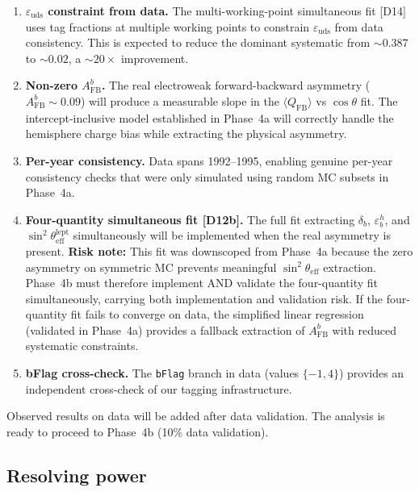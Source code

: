 \documentclass[11pt,a4paper]{article}
\begin{document}
\begin{enumerate}
\item \textbf{$\varepsilon_\mathrm{uds}$ constraint from data.} The multi-working-point
simultaneous fit [D14] uses tag fractions at multiple working points to constrain
$\varepsilon_\mathrm{uds}$ from data consistency. This is expected to reduce the
dominant systematic from $\sim 0.387$ to $\sim 0.02$, a $\sim 20\times$ improvement.

\item \textbf{Non-zero $A_\mathrm{FB}^b$.} The real electroweak forward-backward
asymmetry ($A_\mathrm{FB}^b \sim 0.09$) will produce a measurable slope in the
$\langle Q_\mathrm{FB} \rangle$ vs $\cos\theta$ fit. The intercept-inclusive model
established in Phase~4a will correctly handle the hemisphere charge bias while
extracting the physical asymmetry.

\item \textbf{Per-year consistency.} Data spans 1992--1995, enabling genuine per-year
consistency checks that were only simulated using random MC subsets in Phase~4a.

\item \textbf{Four-quantity simultaneous fit [D12b].} The full fit extracting
$\delta_b$, $\varepsilon_b^h$, and $\sin^2\theta_\mathrm{eff}^\mathrm{lept}$
simultaneously will be implemented when the real asymmetry is present.
\textbf{Risk note:} This fit was downscoped from Phase~4a because the
zero asymmetry on symmetric MC prevents meaningful $\sin^2\theta_\mathrm{eff}$
extraction. Phase~4b must therefore implement AND validate the four-quantity
fit simultaneously, carrying both implementation and validation risk. If
the four-quantity fit fails to converge on data, the simplified linear
regression (validated in Phase~4a) provides a fallback extraction of
$A_\mathrm{FB}^b$ with reduced systematic constraints.

\item \textbf{bFlag cross-check.} The \texttt{bFlag} branch in data (values $\{-1, 4\}$)
provides an independent cross-check of our tagging infrastructure.
\end{enumerate}

Observed results on data will be added after data validation. The analysis is ready
to proceed to Phase~4b (10\% data validation).

\subsection{Resolving power}
\label{sec:resolving_power}
\end{document}
